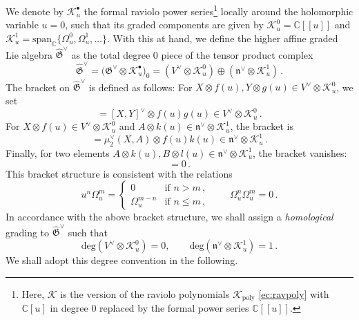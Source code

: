 \documentclass[11pt]{amsart}
\newcommand{\C}{{\mathbb C}}
\newcommand{\CK}{{\mathcal K}}
\newcommand{\fn}{\mathfrak{n}}
\newcommand{\fG}{\mathfrak{G}}
\numberwithin{equation}{section}
\numberwithin{figure}{section}
\numberwithin{table}{section}
\theoremstyle{thm}
\numberwithin{equation}{subsection}
\theoremstyle{definition}
\theoremstyle{rem}
\begin{document}
We denote by $\CK_u^\bullet$ the formal raviolo power series\footnote{Here, $\mathcal{K}$ is the version of the raviolo polynomials $\mathcal{K}_\text{poly}$ \eqref{ec:ravpoly} with $\mathbb{C}[u]$ in degree 0 replaced by the formal power series $\mathbb{C}[\![u]\!]$.} locally around the holomorphic variable $u=0$, such that its graded components are given by \( \CK_u^0 =\C[\![u]\!]\) and \( \CK_u^1 = \mathrm{span}_\C\{\Omega^0_u,\Omega^1_u,\dots\} \). With this at hand, we define the higher affine graded Lie algebra \( \widehat{\mathfrak{G}}^\vee \) as the total degree 0 piece of the tensor product complex
\begin{equation}
    \widehat{\mathfrak{G}}^\vee =\big( \fG^\vee\otimes\mathcal{K}^\bullet_u\big)_0 = \left(V^\vee \otimes \CK_u^0\right) \oplus \left(\fn^\vee \otimes \CK_u^1\right)\,.
\end{equation}
 The bracket on \( \widehat{\mathfrak{G}}^\vee \) is defined as follows:
For \( X \otimes f(u), Y \otimes g(u) \in V^\vee \otimes \CK_u^0 \), we set
\begin{equation}
    [X \otimes f(u), Y \otimes g(u)] = [X,Y]^\vee \otimes f(u)g(u) \in V^\vee \otimes \CK_u^0\,.
\end{equation}
For \( X \otimes f(u) \in V^\vee \otimes \CK_u^0 \) and \( A \otimes k(u) \in \fn^\vee \otimes \CK_u^1 \), the bracket is
\begin{equation}
    [X \otimes f(u), A \otimes k(u)] = \mu_2^\vee(X,A) \otimes f(u)k(u) \in \fn^\vee \otimes \CK_u^1\,.
\end{equation}
Finally, for two elements \( A \otimes k(u), B \otimes l(u) \in \fn^\vee \otimes \CK_u^1 \), the bracket vanishes:
\begin{equation}
    [A \otimes k(u), B \otimes l(u)] = 0\,.
\end{equation}
This bracket structure is consistent with the relations 
\begin{equation}
\label{ec:raviolorelations}
    u^n \Omega^m_u = 
    \begin{cases}
        0 & \text{if } n > m\,, \\
        \Omega^{m-n}_u & \text{if } n \leq m\,,
    \end{cases}
    \qquad \Omega^n_u \Omega^m_u = 0\,.
\end{equation}
In accordance with the above bracket structure, we shall assign a \textit{homological} grading to $\widehat{\fG}^\vee$ such that
\begin{equation}\label{degconvention}
     \text{deg}\left(V^\vee \otimes \CK_u^0\right) =0,\qquad \text{deg}\left(\fn^\vee \otimes \CK_u^1\right)=1\,.
\end{equation}
We shall adopt this degree convention in the following.
\end{document}
